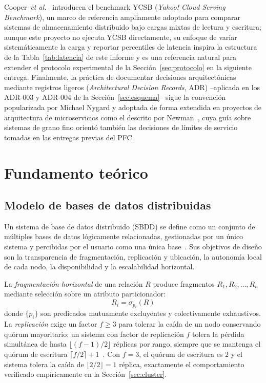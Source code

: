 \documentclass[10pt,twocolumn]{article}
\begin{document}
Cooper~\emph{et al.}~\cite{taipalus2023dbms} introducen el benchmark YCSB
(\emph{Yahoo! Cloud Serving Benchmark}), un marco de referencia ampliamente
adoptado para comparar sistemas de almacenamiento distribuido bajo cargas
mixtas de lectura y escritura; aunque este proyecto no ejecuta YCSB
directamente, su enfoque de variar sistemáticamente la carga y reportar
percentiles de latencia inspira la estructura de la Tabla~\ref{tab:latencia}
de este informe y es una referencia natural para extender el protocolo
experimental de la Sección~\ref{sec:protocolo} en la siguiente entrega.
Finalmente, la práctica de documentar decisiones arquitectónicas mediante
registros ligeros (\emph{Architectural Decision Records}, ADR) --aplicada
en los ADR-003 y ADR-004 de la Sección~\ref{sec:esquema}-- sigue la
convención popularizada por Michael Nygard y adoptada de forma extendida en
proyectos de arquitectura de microservicios como el descrito por
Newman~\cite{li2021microservices}, cuya guía sobre sistemas de grano fino orientó
también las decisiones de límites de servicio tomadas en las entregas
previas del PFC.

\section{Fundamento teórico}
\label{sec:teoria}

\subsection{Modelo de bases de datos distribuidas}

Un sistema de base de datos distribuido (SBDD) se define como un conjunto
de múltiples bases de datos lógicamente relacionadas, gestionadas por un
único sistema y percibidas por el usuario como una única base~\cite{ozsu2020}.
Sus objetivos de diseño son la transparencia de fragmentación, replicación
y ubicación, la autonomía local de cada nodo, la disponibilidad y la
escalabilidad horizontal.

La \emph{fragmentación horizontal} de una relación $R$ produce fragmentos
$R_1, R_2, \ldots, R_n$ mediante selección sobre un atributo particionador:
\begin{equation}
R_i = \sigma_{p_i}(R)
\label{eq:fragmentacion}
\end{equation}
donde $\{p_i\}$ son predicados mutuamente excluyentes y colectivamente
exhaustivos. La \emph{replicación} exige un factor $f \geq 3$ para tolerar
la caída de un nodo conservando quórum mayoritario: un sistema con factor
de replicación $f$ tolera la pérdida simultánea de hasta
$\lfloor (f-1)/2 \rfloor$ réplicas por rango, siempre que se mantenga el
quórum de escritura $\lceil f/2 \rceil + 1$~\cite{huang2020tidb,taft2020}. Con
$f=3$, el quórum de escritura es $2$ y el sistema tolera la caída de
$\lfloor 2/2 \rfloor = 1$ réplica, exactamente el comportamiento verificado
empíricamente en la Sección~\ref{sec:cluster}.
\end{document}
